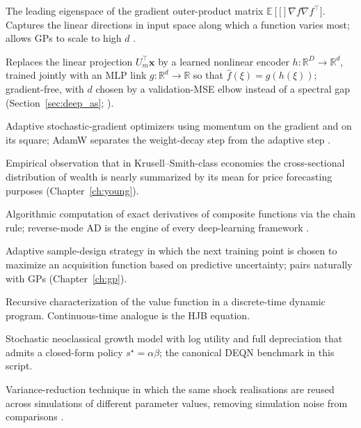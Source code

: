 \documentclass[11pt,a4paper]{report}
\newcommand{\x}{\bm{x}}
\newcommand{\R}{\mathbb{R}}
\newcommand{\E}[1]{\mathbb{E}\!\left[#1\right]}
\begin{document}
\begin{description}[style=nextline, leftmargin=0pt, labelwidth=0pt, labelsep=0pt, itemsep=3pt]
\item[\textbf{Active subspace.}]  The leading eigenspace of the gradient outer-product matrix $\E[\nabla f \nabla f^\top]$.  Captures the linear directions in input space along which a function varies most; allows GPs to scale to high $d$ \citep{constantine2015active}.
\item[\textbf{Active subspace, deep.}]  Replaces the linear projection $U_m^\top \x$ by a learned nonlinear encoder $h\colon \R^D \to \R^d$, trained jointly with an MLP link $g\colon \R^d \to \R$ so that $\hat f(\xi) = g(h(\xi))$; gradient-free, with $d$ chosen by a validation-MSE elbow instead of a spectral gap (Section~\ref{sec:deep_as}; \citealp{tripathy2018deep}).
\item[\textbf{Adam, AdamW.}]  Adaptive stochastic-gradient optimizers using momentum on the gradient and on its square; AdamW separates the weight-decay step from the adaptive step \citep{kingma2015adam, loshchilov2019decoupled}.
\item[\textbf{Approximate aggregation.}]  Empirical observation that in Krusell--Smith-class economies the cross-sectional distribution of wealth is nearly summarized by its mean for price forecasting purposes (Chapter~\ref{ch:young}).
\item[\textbf{Automatic differentiation (AD).}]  Algorithmic computation of exact derivatives of composite functions via the chain rule; reverse-mode AD is the engine of every deep-learning framework \citep{baydin2018automatic, margossian2019review}.
\item[\textbf{Bayesian active learning (BAL).}]  Adaptive sample-design strategy in which the next training point is chosen to maximize an acquisition function based on predictive uncertainty; pairs naturally with GPs (Chapter~\ref{ch:gp}).
\item[\textbf{Bellman equation.}]  Recursive characterization of the value function in a discrete-time dynamic program.  Continuous-time analogue is the HJB equation.
\item[\textbf{Brock--Mirman model.}]  Stochastic neoclassical growth model with log utility and full depreciation that admits a closed-form policy $s^\star = \alpha\beta$; the canonical DEQN benchmark in this script.
\item[\textbf{Common random numbers (CRN).}]  Variance-reduction technique in which the same shock realisations are reused across simulations of different parameter values, removing simulation noise from comparisons \citep{glasserman2004monte}.

\end{description}
\end{document}
